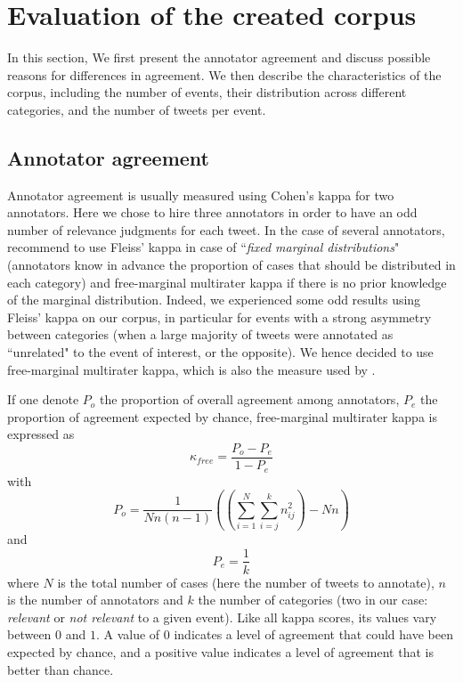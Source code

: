 \section{Evaluation of the created corpus}

In this section, We first present the annotator agreement and discuss possible reasons for differences in agreement. We then describe  the characteristics of the corpus, including the number of events, their distribution across different categories, and the number of tweets per event. 

	\subsection{Annotator agreement}

Annotator agreement is usually measured using Cohen's kappa for two annotators. Here we chose to hire three annotators in order to have an odd number of relevance judgments for each tweet. In the case of several annotators, \citet{randolph_free_2005} recommend to use Fleiss' kappa \citep{fleiss_measuring_1971} in case of ``\textit{fixed marginal distributions}" (annotators know in advance the proportion of cases that should be distributed in each category) and free-marginal multirater kappa \citep{randolph_free_2005} if there is no prior knowledge of the marginal distribution. Indeed, we experienced some odd results using Fleiss' kappa on our corpus, in particular for events with a strong asymmetry between categories (when a large majority of tweets were annotated as ``unrelated" to the event of interest, or the opposite). We hence decided to use free-marginal multirater kappa, which is also the measure used by \citet{mcminn_building_2013}.


If one denote $P_o$ the proportion of overall agreement among annotators, $P_e$ the proportion of agreement expected by chance, free-marginal multirater kappa is expressed as 
$$
\kappa_{free} = \frac{P_o - P_e}{1 - P_e}
$$
with 
$$
P_o = \frac{1}{Nn(n-1)}((\sum_{i=1}^N\sum_{i=j}^kn_{ij}^2)-Nn)
$$
and
$$
P_e = \frac{1}{k}
$$
where $N$ is the total number of cases (here the number of tweets to annotate), $n$ is the number of annotators and $k$ the number of categories (two in our case: \textit{relevant} or \textit{not relevant} to a given event). Like all kappa scores, its values vary between $0$ and $1$. A value of $0$ indicates a level of agreement that could have been expected by chance, and a positive value indicates a level of agreement that is better than chance.


